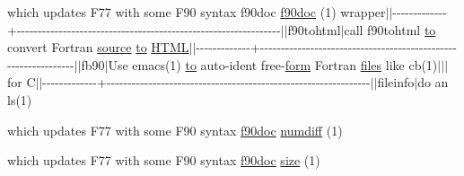 \begin{DoxyCompactItemize}
\item 
which updates F77 with some F90 syntax f90doc \hyperlink{what__overview_81_8txt_aab2f56fdcdfab484c0d861985675a92f}{f90doc} (1) wrapper$\vert$$\vert$-\/-\/-\/-\/-\/-\/-\/-\/-\/-\/-\/-\/-\/+-\/-\/-\/-\/-\/-\/-\/-\/-\/-\/-\/-\/-\/-\/-\/-\/-\/-\/-\/-\/-\/-\/-\/-\/-\/-\/-\/-\/-\/-\/-\/-\/-\/-\/-\/-\/-\/-\/-\/-\/-\/-\/-\/-\/-\/-\/-\/-\/-\/-\/-\/-\/-\/-\/-\/-\/-\/-\/-\/-\/-\/-\/-\/$\vert$$\vert$f90tohtml$\vert$call f90tohtml \hyperlink{M__stopwatch_83_8txt_a97209fd3e34ef701c0a9734280779cbb}{to} convert Fortran \hyperlink{ufpp__overview_81_8txt_a4d6669ece605d05985c83a04dd38e0ad}{source} \hyperlink{M__stopwatch_83_8txt_a97209fd3e34ef701c0a9734280779cbb}{to} \hyperlink{README_8txt_ad2be234454502f9b6337665f9aa3f7aa}{H\+T\+ML}$\vert$$\vert$-\/-\/-\/-\/-\/-\/-\/-\/-\/-\/-\/-\/-\/+-\/-\/-\/-\/-\/-\/-\/-\/-\/-\/-\/-\/-\/-\/-\/-\/-\/-\/-\/-\/-\/-\/-\/-\/-\/-\/-\/-\/-\/-\/-\/-\/-\/-\/-\/-\/-\/-\/-\/-\/-\/-\/-\/-\/-\/-\/-\/-\/-\/-\/-\/-\/-\/-\/-\/-\/-\/-\/-\/-\/-\/-\/-\/$\vert$$\vert$fb90$\vert$Use emacs(1) \hyperlink{M__stopwatch_83_8txt_a97209fd3e34ef701c0a9734280779cbb}{to} auto-\/ident free-\/\hyperlink{what__overview_81_8txt_ab6ccd3cf736f24d661599d9ce944e9bf}{form} Fortran \hyperlink{ufpp__overview_81_8txt_a5673f2294ff1627be40c90eae33141ca}{files} like cb(1)$\vert$$\vert$$\vert$for C$\vert$$\vert$-\/-\/-\/-\/-\/-\/-\/-\/-\/-\/-\/-\/-\/+-\/-\/-\/-\/-\/-\/-\/-\/-\/-\/-\/-\/-\/-\/-\/-\/-\/-\/-\/-\/-\/-\/-\/-\/-\/-\/-\/-\/-\/-\/-\/-\/-\/-\/-\/-\/-\/-\/-\/-\/-\/-\/-\/-\/-\/-\/-\/-\/-\/-\/-\/-\/-\/-\/-\/-\/-\/-\/-\/-\/-\/-\/-\/$\vert$$\vert$fileinfo$\vert$do an ls(1)
\item 
which updates F77 with some F90 syntax \hyperlink{what__overview_81_8txt_aab2f56fdcdfab484c0d861985675a92f}{f90doc} \hyperlink{what__overview_81_8txt_a7d9f0f7f68d767709cf298ae59490237}{numdiff} (1)
\item 
which updates F77 with some F90 syntax \hyperlink{what__overview_81_8txt_aab2f56fdcdfab484c0d861985675a92f}{f90doc} \hyperlink{what__overview_81_8txt_ab5692ed87074f1d5ec850a9ffa8b5af9}{size} (1)
\end{DoxyCompactItemize}
